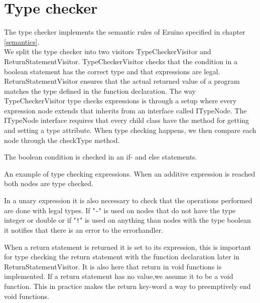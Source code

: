 \section{Type checker}
The type checker implements the semantic rules of Ezuino specified in chapter \ref{semantics}. \\
We split the type checker into two visitors TypeCheckerVisitor and ReturnStatementVisitor. TypeCheckerVisitor checks that the condition in a boolean statement has the correct type and that expressions are legal. ReturnStatementVisitor ensures that the actual returned value of a program matches the type defined in the function declaration.
The way TypeCheckerVisitor type checks expressions is through a setup where every expression node extends that inherits from an interface called ITypeNode. The ITypeNode interface requires that every child class have the method for getting and setting a type attribute. When type checking happens, we then compare each node through the checkType method.

\noindent\newline

The boolean condition is checked in an if- and else statements.

\noindent\newline

An example of type checking expressions. When an additive expression is reached both nodes are type checked.

\noindent\newline

In a unary expression it is also necessary to check that the operations performed are done with legal types. If "\texttt{-}" is used on nodes that do not have the type integer or double or if "\texttt{!}" is used on anything than nodes with the type boolean it notifies that there is an error to the errorhandler.   

\noindent\newline

When a return statement is returned it is set to its expression, this is important for type checking the return statement with the function declaration later in ReturnStatementVisitor.
It is also here that return in void functions is implemented. If a return statement has no value,we assume it to be a void function. This in practice makes the return key-word a way to preemptively end void functions.

\noindent\newline

